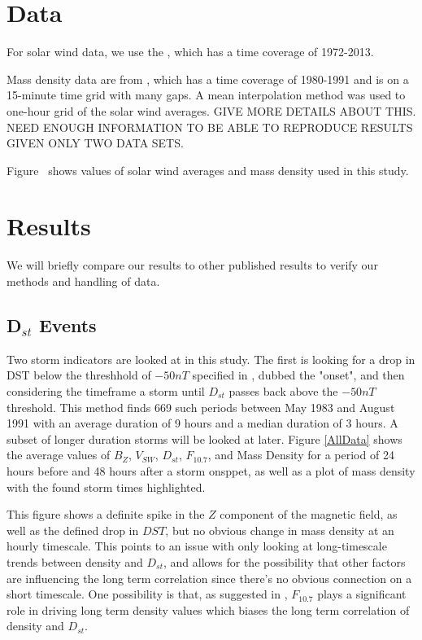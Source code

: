 \documentclass[10pt,twocolumn]{article}
\begin{document}
\section{Data}

For solar wind data, we use the \cite{Reconstruction}, which has a time coverage of 1972-2013.

Mass density data are from \cite{Denton}, which has a time coverage of 1980-1991 and is on a 15-minute time grid with many gaps.  A mean interpolation method was used to one-hour grid of the solar wind averages.  GIVE MORE DETAILS ABOUT THIS.  NEED ENOUGH INFORMATION TO BE ABLE TO REPRODUCE RESULTS GIVEN ONLY TWO DATA SETS.

Figure~\label{AllData} shows values of solar wind averages and mass density used in this study.

\section{Results}

We will briefly compare our results to other published results to verify our methods and handling of data. 

\subsection{D$_{st}$ Events}
Two storm indicators are looked at in this study. The first is looking for a drop in DST below the threshhold of $-50nT$ specified in \cite{Takahashi2010}, dubbed the "onset", and then considering the timeframe a storm until $D_{st}$ passes back above the $-50nT$ threshold. This method finds 669 such periods between May 1983 and August 1991 with an average duration of 9 hours and a median duration of 3 hours. A subset of longer duration storms will be looked at later. Figure \ref{AllData} shows the average values of $B_Z$, $V_{SW}$, $D_{st}$, $F_{10.7}$, and Mass Density for a period of 24 hours before and 48 hours after a storm onsppet, as well as a plot of mass density with the found storm times highlighted.

This figure shows a definite spike in the $Z$ component of the magnetic field, as well as the defined drop in $DST$, but no obvious change in mass density at an hourly timescale. This points to an issue with only looking at long-timescale trends between density and $D_{st}$, and allows for the possibility that other factors are influencing the long term correlation since there's no obvious connection on a short timescale. One possibility is that, as suggested in \cite{Takahashi2010}, $F_{10.7}$ plays a significant role in driving long term density values which biases the long term correlation of density and $D_{st}$.
\end{document}
